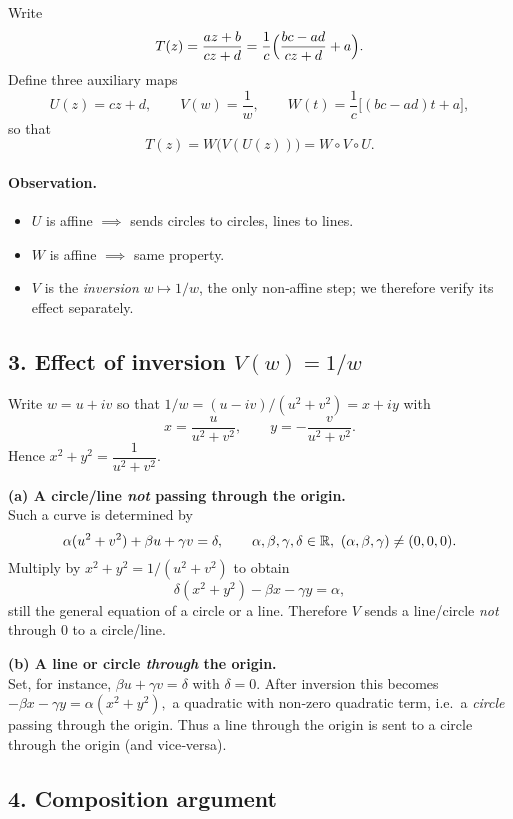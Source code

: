 \documentclass[12pt]{article}
\theoremstyle{definition} %
\theoremstyle{plain} %
\begin{document}
Write
\[
   T(z)=\frac{az+b}{cz+d}
       =\frac1c\Bigl(\frac{bc-ad}{cz+d}+a\Bigr).
\]
Define three auxiliary maps
\[
   U(z)=cz+d,\qquad
   V(w)=\frac1w,\qquad
   W(t)=\frac{1}{c}\bigl[(bc-ad)t+a\bigr],
\]
so that
\[
   T(z)=W\!\bigl(V(U(z))\bigr)=W\circ V\circ U.
\]

\paragraph{Observation.}
\begin{itemize}
\item $U$ is affine $\implies$ sends circles to circles, lines to lines.
\item $W$ is affine $\implies$ same property.
\item $V$ is the \emph{inversion} $w\mapsto 1/w$,
      the only non‑affine step; we therefore verify its effect separately.
\end{itemize}

\subsection*{3.  Effect of inversion \(V(w)=1/w\)}

Write $w=u+iv$ so that
\(
   1/w=(u-iv)/(u^{2}+v^{2})=x+iy
\)
with
\[
   x=\frac{u}{u^{2}+v^{2}},\qquad
   y=-\frac{v}{u^{2}+v^{2}}.
\]
Hence
\(
   x^{2}+y^{2}=\dfrac1{u^{2}+v^{2}}.
\)

\medskip
\noindent\textbf{(a) A circle/line \emph{not} passing through the origin.}\\
Such a curve is determined by
\[
   \alpha(u^{2}+v^{2})+\beta u+\gamma v=\delta,\qquad
   \alpha,\beta,\gamma,\delta\in\Bbb R,\ 
   (\alpha,\beta,\gamma)\ne(0,0,0).
\]
Multiply by $x^{2}+y^{2}=1/(u^{2}+v^{2})$ to obtain
\[
   \delta(x^{2}+y^{2})-\beta x-\gamma y=\alpha,
\]
still the general equation of a circle or a line.  
Therefore \(V\) sends a line/circle \emph{not} through \(0\) to a
circle/line.

\medskip
\noindent\textbf{(b) A line or circle \emph{through} the origin.}\\
Set, for instance, $\beta u+\gamma v=\delta$ with $\delta=0$.  
After inversion this becomes
\(
   -\beta x-\gamma y=\alpha(x^{2}+y^{2}),
\)
a quadratic with non‑zero quadratic term, i.e.\ a \emph{circle}
passing through the origin.  
Thus a line through the origin is sent to a circle through the origin
(and vice‑versa).

\subsection*{4.  Composition argument}
\end{document}
